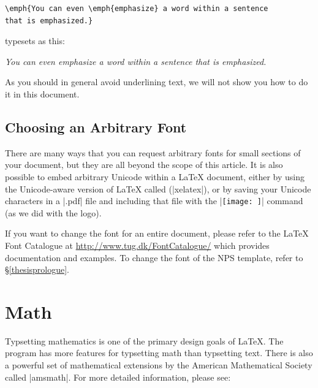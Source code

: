 \begin{center}
\begin{Verbatim}
\emph{You can even \emph{emphasize} a word within a sentence
that is emphasized.}
\end{Verbatim}
\end{center}

typesets as this:

\begin{center}
\emph{You can even \emph{emphasize} a word within a sentence that is emphasized.}
\end{center}

As you should in general avoid underlining text, we will not show you
how to do it in this document.

\subsection{Choosing an Arbitrary Font}
There are many ways that you can request arbitrary fonts for small
sections of your document, but they are all beyond the scope of this
article. It is also possible to embed arbitrary Unicode within a
\LaTeX{} document, either by using the Unicode-aware version of
\LaTeX{} called  (|xelatex|), or by saving your Unicode characters in a |.pdf| file and
including that file with the |\texttt{[image: ]}| command (as we
did with the  logo).

If you want to change the font for an entire document, please refer to the
\LaTeX{} Font Catalogue at \url{http://www.tug.dk/FontCatalogue/}
which provides documentation and examples.  To change the font of the
NPS template, refer to \S\ref{thesisprologue}.

\section{Math}\label{math}

Typsetting mathematics is one of the primary design goals of
\LaTeX. The program  has more features for typsetting math
than typsetting text. There is also a powerful set of mathematical
extensions by the American Mathematical Society called |amsmath|. 
For more detailed information, please see:

